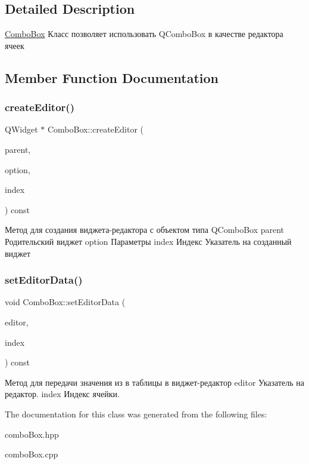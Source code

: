 \subsection{Detailed Description}
\mbox{\hyperlink{class_combo_box}{Combo\+Box}} Класс позволяет использовать Q\+Combo\+Box в качестве редактора ячеек 

\subsection{Member Function Documentation}
\mbox{\label{class_combo_box_a1fd453e6efcb87acddce5038e0b539df}} 
\subsubsection{\texorpdfstring{createEditor()}{createEditor()}}
{\footnotesize\ttfamily Q\+Widget $\ast$ Combo\+Box\+::create\+Editor (\begin{DoxyParamCaption}\item[{Q\+Widget $\ast$}]{parent,  }\item[{const Q\+Style\+Option\+View\+Item \&}]{option,  }\item[{const Q\+Model\+Index \&}]{index }\end{DoxyParamCaption}) const\hspace{0.3cm}{\ttfamily [override]}}

Метод для создания виджета-\/редактора с объектом типа Q\+Combo\+Box parent Родительский виджет option Параметры index Индекс Указатель на созданный виджет \mbox{\label{class_combo_box_aeb2ad78f056f1d46f8ad43531df65581}} 
\subsubsection{\texorpdfstring{setEditorData()}{setEditorData()}}
{\footnotesize\ttfamily void Combo\+Box\+::set\+Editor\+Data (\begin{DoxyParamCaption}\item[{Q\+Widget $\ast$}]{editor,  }\item[{const Q\+Model\+Index \&}]{index }\end{DoxyParamCaption}) const\hspace{0.3cm}{\ttfamily [override]}}

Метод для передачи значения из в таблицы в виджет-\/редактор editor Указатель на редактор. index Индекс ячейки. 

The documentation for this class was generated from the following files\+:\begin{DoxyCompactItemize}
\item 
combo\+Box.\+hpp\item 
combo\+Box.\+cpp\end{DoxyCompactItemize}
